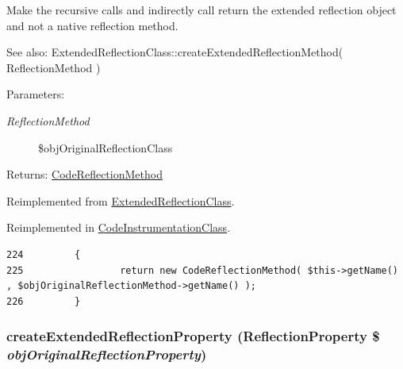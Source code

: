 Make the recursive calls and indirectly call return the extended reflection object and not a native reflection method.

\begin{Desc}
\item[See also:]ExtendedReflectionClass::createExtendedReflectionMethod( ReflectionMethod ) \end{Desc}
\begin{Desc}
\item[Parameters:]
\begin{description}
\item[{\em ReflectionMethod}]\$objOriginalReflectionClass \end{description}
\end{Desc}
\begin{Desc}
\item[Returns:]\hyperlink{class_code_reflection_method}{CodeReflectionMethod} \end{Desc}


Reimplemented from \hyperlink{class_extended_reflection_class_ec7c1d4b204b6e3a6291d3b867afb688}{ExtendedReflectionClass}.

Reimplemented in \hyperlink{class_code_instrumentation_class_ec7c1d4b204b6e3a6291d3b867afb688}{CodeInstrumentationClass}.

\begin{Code}\begin{verbatim}224         {
225                 return new CodeReflectionMethod( $this->getName() , $objOriginalReflectionMethod->getName() );
226         }
\end{verbatim}
\end{Code}


\hypertarget{class_code_reflection_class_bce271bf4f7b77b8b11986404241ab5c}{
\subsubsection[{createExtendedReflectionProperty}]{\setlength{\rightskip}{0pt plus 5cm}createExtendedReflectionProperty (ReflectionProperty \$ {\em objOriginalReflectionProperty})}}
\label{class_code_reflection_class_bce271bf4f7b77b8b11986404241ab5c}


